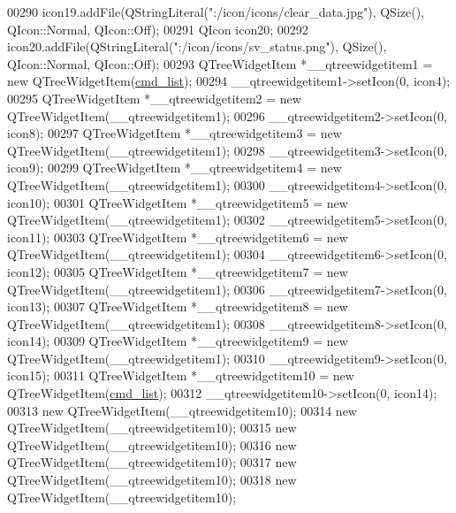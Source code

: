 \begin{DoxyCode}
00290         icon19.addFile(QStringLiteral(\textcolor{stringliteral}{":/icon/icons/clear\_data.jpg"}), QSize(), QIcon::Normal, QIcon::Off);
00291         QIcon icon20;
00292         icon20.addFile(QStringLiteral(\textcolor{stringliteral}{":/icon/icons/sv\_status.png"}), QSize(), QIcon::Normal, QIcon::Off);
00293         QTreeWidgetItem *\_\_qtreewidgetitem1 = \textcolor{keyword}{new} QTreeWidgetItem(\hyperlink{a00027_aa66ece71395b435e915d384fb63bac1d}{cmd\_list});
00294         \_\_qtreewidgetitem1->setIcon(0, icon4);
00295         QTreeWidgetItem *\_\_qtreewidgetitem2 = \textcolor{keyword}{new} QTreeWidgetItem(\_\_qtreewidgetitem1);
00296         \_\_qtreewidgetitem2->setIcon(0, icon8);
00297         QTreeWidgetItem *\_\_qtreewidgetitem3 = \textcolor{keyword}{new} QTreeWidgetItem(\_\_qtreewidgetitem1);
00298         \_\_qtreewidgetitem3->setIcon(0, icon9);
00299         QTreeWidgetItem *\_\_qtreewidgetitem4 = \textcolor{keyword}{new} QTreeWidgetItem(\_\_qtreewidgetitem1);
00300         \_\_qtreewidgetitem4->setIcon(0, icon10);
00301         QTreeWidgetItem *\_\_qtreewidgetitem5 = \textcolor{keyword}{new} QTreeWidgetItem(\_\_qtreewidgetitem1);
00302         \_\_qtreewidgetitem5->setIcon(0, icon11);
00303         QTreeWidgetItem *\_\_qtreewidgetitem6 = \textcolor{keyword}{new} QTreeWidgetItem(\_\_qtreewidgetitem1);
00304         \_\_qtreewidgetitem6->setIcon(0, icon12);
00305         QTreeWidgetItem *\_\_qtreewidgetitem7 = \textcolor{keyword}{new} QTreeWidgetItem(\_\_qtreewidgetitem1);
00306         \_\_qtreewidgetitem7->setIcon(0, icon13);
00307         QTreeWidgetItem *\_\_qtreewidgetitem8 = \textcolor{keyword}{new} QTreeWidgetItem(\_\_qtreewidgetitem1);
00308         \_\_qtreewidgetitem8->setIcon(0, icon14);
00309         QTreeWidgetItem *\_\_qtreewidgetitem9 = \textcolor{keyword}{new} QTreeWidgetItem(\_\_qtreewidgetitem1);
00310         \_\_qtreewidgetitem9->setIcon(0, icon15);
00311         QTreeWidgetItem *\_\_qtreewidgetitem10 = \textcolor{keyword}{new} QTreeWidgetItem(\hyperlink{a00027_aa66ece71395b435e915d384fb63bac1d}{cmd\_list});
00312         \_\_qtreewidgetitem10->setIcon(0, icon14);
00313         \textcolor{keyword}{new} QTreeWidgetItem(\_\_qtreewidgetitem10);
00314         \textcolor{keyword}{new} QTreeWidgetItem(\_\_qtreewidgetitem10);
00315         \textcolor{keyword}{new} QTreeWidgetItem(\_\_qtreewidgetitem10);
00316         \textcolor{keyword}{new} QTreeWidgetItem(\_\_qtreewidgetitem10);
00317         \textcolor{keyword}{new} QTreeWidgetItem(\_\_qtreewidgetitem10);
00318         \textcolor{keyword}{new} QTreeWidgetItem(\_\_qtreewidgetitem10);

\end{DoxyCode}
